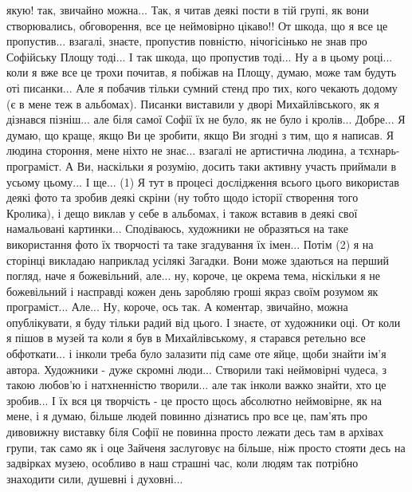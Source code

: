 якую! так, звичайно можна... Так, я читав деякі пости в тій групі, як вони
створювались, обговорення, все це неймовірно цікаво!! От шкода, що я все це
пропустив... взагалі, знаєте, пропустив повністю, нічогісінько не знав про
Софійську Площу тоді... І так шкода, що пропустив тоді... Ну а в цьому році...
коли я вже все це трохи почитав, я побіжав на Площу, думаю, може там будуть оті
писанки... Але я побачив тільки сумний стенд про тих, кого чекають додому (є в
мене теж в альбомах). Писанки виставили у дворі Михайлівського, як я дізнався
пізніш... але біля самої Софії їх не було, як не було і кролів... Добре... Я
думаю, що краще, якщо Ви це зробити, якщо Ви згодні з тим, що я написав. Я
людина стороння, мене ніхто не знає... взагалі не артистична людина, а
тєхнарь-програміст. А Ви, наскільки я розумію, досить таки активну участь
приймали в усьому цьому... І ще... (1) Я тут в процесі дослідження всього цього
використав деякі фото та зробив деякі скріни (ну тобто щодо історії створення
того Кролика), і дещо виклав у себе в альбомах, і також вставив в деякі свої
намальовані картинки... Сподіваюсь, художники не образяться на таке
використання фото їх творчості та таке згадування їх імен... Потім (2) я на
сторінці викладаю наприклад усілякі Загадки. Вони може здаються на перший
погляд, наче я божевільний, але... ну, короче, це окрема тема, ніскільки я не
божевільний і насправді кожен день заробляю гроші якраз своїм розумом як
програміст... Але... Ну, короче, ось так. А коментар, звичайно, можна
опублікувати, я буду тільки радий від цього. І знаєте, от художники оці. От
коли я пішов в музей та коли я був в Михайлівському, я старався ретельно все
обфоткати... і інколи треба було залазити під саме оте яйце, щоби знайти ім'я
автора. Художники - дуже скромні люди... Створили такі неймовірні чудеса, з
такою любов'ю і натхненністю творили... але так інколи важко знайти, хто це
зробив... І їх вся ця творчість - це просто щось абсолютно неймовірне, як на
мене, і я думаю, більше людей повинно дізнатись про все це, пам'ять про
дивовижну виставку біля Софії не повинна просто лежати десь там в архівах
групи, так само як і оце Зайченя заслуговує на більше, ніж просто стояти десь
на задвірках музею, особливо в наш страшні час, коли людям так потрібно
знаходити сили, душевні і духовні...


